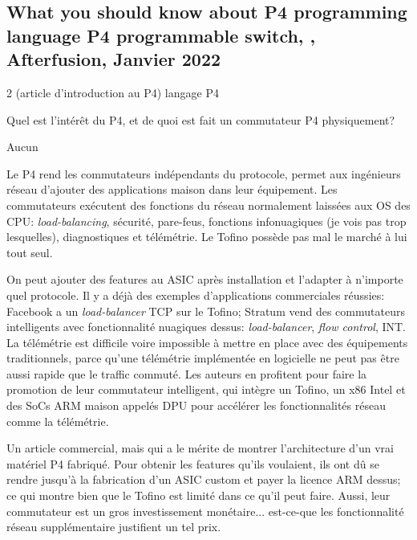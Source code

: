 
\subsection{What you should know about P4 programming language P4 programmable switch, \cite{noauthor_what_2022}, Afterfusion, Janvier 2022}
 2 (article d'introduction au P4)
 langage P4

 Quel est l'intérêt du P4, et de quoi est fait un commutateur P4 physiquement?

 Aucun

 Le P4 rend les commutateurs indépendants du protocole, permet aux ingénieurs réseau d'ajouter des applications maison dans leur équipement. Les commutateurs exécutent des fonctions du réseau normalement laissées aux OS des CPU: \emph{load-balancing}, sécurité, pare-feus, fonctions infonuagiques (je vois pas trop lesquelles), diagnostiques et télémétrie. Le Tofino possède pas mal le marché à lui tout seul.

 On peut ajouter des features au ASIC après installation et l'adapter à n'importe quel protocole. Il y a déjà des exemples d'applications commerciales réussies: Facebook a un \emph{load-balancer} TCP sur le Tofino; Stratum vend des commutateurs intelligents avec fonctionnalité nuagiques dessus: \emph{load-balancer}, \emph{flow control}, INT. La télémétrie est difficile voire impossible à mettre en place avec des équipements traditionnels, parce qu'une télémétrie implémentée en logicielle ne peut pas être aussi rapide que le traffic commuté. Les auteurs en profitent pour faire la promotion de leur commutateur intelligent, qui intègre un Tofino, un x86 Intel et des SoCs ARM maison appelés DPU pour accélérer les fonctionnalités réseau comme la télémétrie.

 Un article commercial, mais qui a le mérite de montrer l'architecture d'un vrai matériel P4 fabriqué. Pour obtenir les features qu'ils voulaient, ils ont dû se rendre jusqu'à la fabrication d'un ASIC custom et payer la licence ARM dessus; ce qui montre bien que le Tofino est limité dans ce qu'il peut faire. Aussi, leur commutateur est un gros investissement monétaire... est-ce-que les fonctionnalité réseau supplémentaire justifient un tel prix.

\clearpage
